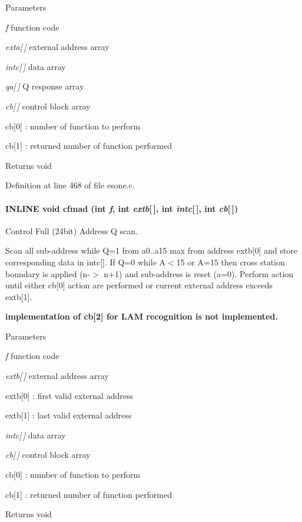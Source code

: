 \begin{DoxyParams}{Parameters}
\item[{\em f}]function code \item[{\em exta\mbox{[}$\,$\mbox{]}}]external address array \item[{\em intc\mbox{[}$\,$\mbox{]}}]data array \item[{\em qa\mbox{[}$\,$\mbox{]}}]Q response array \item[{\em cb\mbox{[}$\,$\mbox{]}}]control block array\par
 cb\mbox{[}0\mbox{]} : number of function to perform\par
 cb\mbox{[}1\mbox{]} : returned number of function performed \end{DoxyParams}
\begin{DoxyReturn}{Returns}
void 
\end{DoxyReturn}


Definition at line 468 of file esone.c.
\paragraph[{cfmad}]{\setlength{\rightskip}{0pt plus 5cm}INLINE void cfmad (int {\em f}, \/  int {\em extb}\mbox{[}$\,$\mbox{]}, \/  int {\em intc}\mbox{[}$\,$\mbox{]}, \/  int {\em cb}\mbox{[}$\,$\mbox{]})}\hfill\label{esone_8c_a10b65b96bee13abd5aa5ddf145c586e8}
Control Full (24bit) Address Q scan.

Scan all sub-\/address while Q=1 from a0..a15 max from address extb\mbox{[}0\mbox{]} and store corresponding data in intc\mbox{[}\mbox{]}. If Q=0 while A$<$15 or A=15 then cross station boundary is applied (n-\/$>$ n+1) and sub-\/address is reset (a=0). Perform action until either cb\mbox{[}0\mbox{]} action are performed or current external address exceeds extb\mbox{[}1\mbox{]}.

{\bfseries implementation of cb\mbox{[}2\mbox{]} for LAM recognition is not implemented.}


\begin{DoxyParams}{Parameters}
\item[{\em f}]function code \item[{\em extb\mbox{[}$\,$\mbox{]}}]external address array\par
 extb\mbox{[}0\mbox{]} : first valid external address \par
 extb\mbox{[}1\mbox{]} : last valid external address \item[{\em intc\mbox{[}$\,$\mbox{]}}]data array \item[{\em cb\mbox{[}$\,$\mbox{]}}]control block array \par
 cb\mbox{[}0\mbox{]} : number of function to perform \par
 cb\mbox{[}1\mbox{]} : returned number of function performed \end{DoxyParams}
\begin{DoxyReturn}{Returns}
void 
\end{DoxyReturn}


